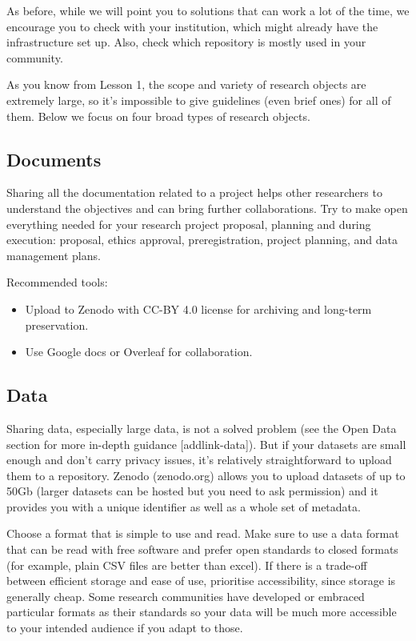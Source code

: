 \documentclass[
  letterpaper,
  DIV=11,
  numbers=noendperiod]{scrreport}
\providecommand{\tightlist}{%
  \setlength{\itemsep}{0pt}\setlength{\parskip}{0pt}}\usepackage{longtable,booktabs,array}
\begin{document}
As before, while we will point you to solutions that can work a lot of
the time, we encourage you to check with your institution, which might
already have the infrastructure set up. Also, check which repository is
mostly used in your community.

As you know from Lesson 1, the scope and variety of research objects are
extremely large, so it's impossible to give guidelines (even brief ones)
for all of them. Below we focus on four broad types of research objects.

\hypertarget{documents}{%
\subsection{Documents}\label{documents}}

Sharing all the documentation related to a project helps other
researchers to understand the objectives and can bring further
collaborations. Try to make open everything needed for your research
project proposal, planning and during execution: proposal, ethics
approval, preregistration, project planning, and data management plans.

Recommended tools:

\begin{itemize}
\tightlist
\item
  Upload to Zenodo with CC-BY 4.0 license for archiving and long-term
  preservation.
\item
  Use Google docs or Overleaf for collaboration.
\end{itemize}

\hypertarget{data-1}{%
\subsection{Data}\label{data-1}}

Sharing data, especially large data, is not a solved problem (see the
Open Data section for more in-depth guidance {[}addlink-data{]}). But if
your datasets are small enough and don't carry privacy issues, it's
relatively straightforward to upload them to a repository. Zenodo
(zenodo.org) allows you to upload datasets of up to 50Gb (larger
datasets can be hosted but you need to ask permission) and it provides
you with a unique identifier as well as a whole set of metadata.

Choose a format that is simple to use and read. Make sure to use a data
format that can be read with free software and prefer open standards to
closed formats (for example, plain CSV files are better than excel). If
there is a trade-off between efficient storage and ease of use,
prioritise accessibility, since storage is generally cheap. Some
research communities have developed or embraced particular formats as
their standards so your data will be much more accessible to your
intended audience if you adapt to those.
\end{document}

